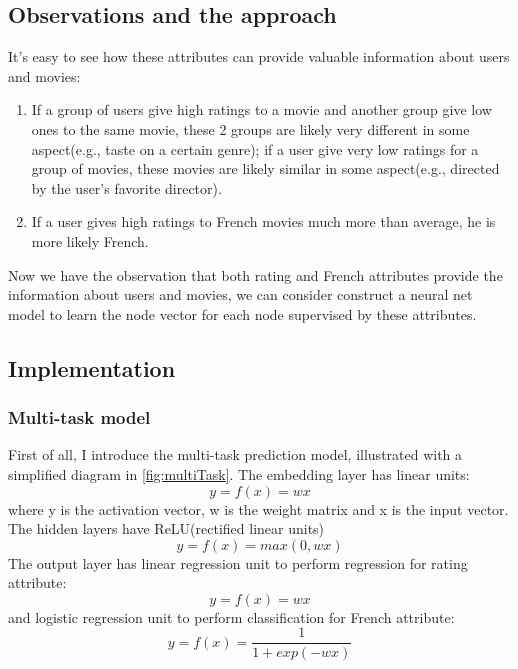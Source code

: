 \documentclass{article}
\begin{document}
\subsection{Observations and the approach}

It's easy to see how these attributes can provide valuable information about users and movies: 
\begin{enumerate}
	\item If a group of users give high ratings to a movie and another group give low ones to the same movie, these 2 groups are likely very different in some aspect(e.g., taste on a certain genre); if a user give very low ratings for a group of movies, these movies are likely similar in some aspect(e.g., directed by the user's favorite director).
	\item If a user gives high ratings to French movies much more than average, he is more likely French.
\end{enumerate}
Now we have the observation that both rating and French attributes provide the information about users and movies, we can consider construct a neural net model to learn the node vector for each node supervised by these attributes.

\subsection{Implementation}

\subsubsection{Multi-task model}

First of all, I introduce the multi-task prediction model, illustrated with a simplified diagram in \autoref{fig:multiTask}. The embedding layer has linear units:
\begin{equation}
y = f(x) = w x
\end{equation}
where y is the activation vector, w is the weight matrix and x is the input vector. The hidden layers have ReLU(rectified linear units)
\begin{equation}
y = f(x) = max(0, w x)
\end{equation}
The output layer has linear regression unit to perform regression for rating attribute:
\begin{equation}
	y = f(x) = w x
\end{equation}
and logistic regression unit to perform classification for French attribute:
\begin{equation}
	y = f(x) = \frac{1}{1 + exp(-w x)}
\end{equation}
\end{document}
